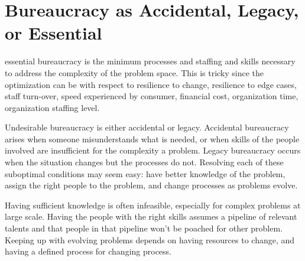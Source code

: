 \section{Bureaucracy as Accidental, Legacy, or Essential}
\gls{essential bureaucracy} is the minimum processes and staffing and skills necessary to address the complexity of the problem space. This is tricky since the optimization can be with respect to resilience to change, resilience to edge cases, staff turn-over, speed experienced by consumer, financial cost, organization time, organization staffing level.

Undesirable bureaucracy is either accidental or legacy. Accidental bureaucracy arises when someone misunderstands what is needed, or when skills of the people involved are insufficient for the complexity a problem. Legacy bureaucracy occurs when the situation changes but the processes do not. Resolving each of these suboptimal conditions may seem easy: have better knowledge of the problem, assign the right people to the problem, and change processes as problems evolve. 

Having sufficient knowledge is often infeasible, especially for complex problems at large scale. Having the people with the right skills assumes a pipeline of relevant talents and that people in that pipeline won't be poached for other problem. Keeping up with evolving problems depends on having resources to change, and having a defined process for changing process. 